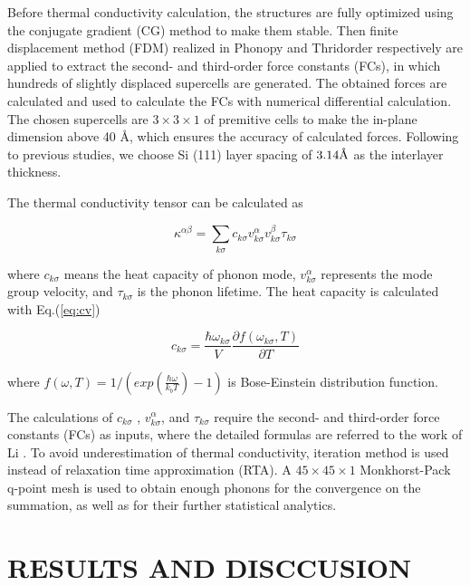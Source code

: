\documentclass[aps,prb,twocolumn,showpacs,amsmath,amssymb]{revtex4-1}
\newcommand{\angstrom}{\mbox{\normalfont\AA}}
\begin{document}
Before thermal conductivity calculation, the  structures are fully optimized using the conjugate gradient (CG) method to make them stable.  Then finite displacement method (FDM) realized in Phonopy\cite{Togo2008} and Thridorder respectively are applied to extract the second- and third-order force constants (FCs), in which hundreds of  slightly displaced supercells are generated. The obtained forces are calculated and used to calculate the FCs with numerical differential calculation. The chosen supercells are $3 \times 3 \times 1$ of premitive cells to make the in-plane dimension above 40 \angstrom, which ensures  the accuracy of calculated forces. Following to previous studies, we choose Si (111) layer spacing of $3.14 \angstrom$ as the interlayer thickness.

The thermal conductivity tensor can be calculated as

\begin{equation}
  \kappa^{\alpha\beta} = \sum_{k \sigma}{c_{k \sigma}v^{\alpha}_{k \sigma}v^{\beta}_{k \sigma}\tau_{k \sigma}} \label{eq:kappasum}
\end{equation}

where $c_{k \sigma}$ means the heat capacity of phonon mode,  $v_{k \sigma}^{\alpha}$ represents the mode group velocity, and $\tau_{k \sigma}$ is the phonon lifetime. The heat capacity is calculated with Eq.(\ref{eq:cv}) 

\begin{equation}
  c_{k \sigma}=\frac{\hbar \omega_{k \sigma} }{V} \frac{\partial f(\omega_{k \sigma},T)}{\partial T} \label{eq:cv}
\end{equation}

where $ f(\omega,T)=1/(exp(\frac{\hbar \omega}{k_b T})-1)$ is Bose-Einstein distribution function.

The calculations of $c_{k\sigma}$ , $v_{k \sigma}^{\alpha}$, and $\tau_{k\sigma}$ require the second- and third-order force constants (FCs) as inputs, where the detailed formulas are referred to the work of  Li \cite{Li2014}. To avoid underestimation of thermal conductivity, iteration method is used instead of relaxation time approximation (RTA). A $45\times 45 \times 1$ Monkhorst-Pack q-point mesh is used to obtain enough phonons for the convergence on the summation, as well as for their further statistical analytics.

\section{RESULTS AND DISCCUSION} 
\end{document}
